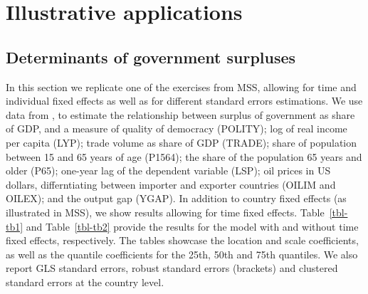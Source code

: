 \documentclass[
  12pt,
  oneside]{article}
\begin{document}
\section{Illustrative applications}\label{illustrative-applications}

\subsection{Determinants of government
surpluses}\label{determinants-of-government-surpluses}

In this section we replicate one of the exercises from MSS, allowing for
time and individual fixed effects as well as for different standard
errors estimations. We use data from \citet{persson_economic_2005}, to
estimate the relationship between surplus of government as share of GDP,
and a measure of quality of democracy (POLITY); log of real income per
capita (LYP); trade volume as share of GDP (TRADE); share of population
between 15 and 65 years of age (P1564); the share of the population 65
years and older (P65); one-year lag of the dependent variable (LSP); oil
prices in US dollars, differntiating between importer and exporter
countries (OILIM and OILEX); and the output gap (YGAP). In addition to
country fixed effects (as illustrated in MSS), we show results allowing
for time fixed effects. Table~\ref{tbl-tb1} and Table~\ref{tbl-tb2}
provide the results for the model with and without time fixed effects,
respectively. The tables showcase the location and scale coefficients,
as well as the quantile coefficients for the 25th, 50th and 75th
quantiles. We also report GLS standard errors, robust standard errors
(brackets) and clustered standard errors at the country level.
\end{document}
